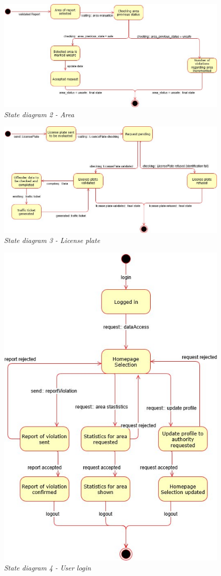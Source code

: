 \begin{figure}[H]
  \centering
  \includegraphics[origin=c,width=\textwidth]{RASD_Images/StateDiagrams/state2.jpg}
  \caption{\textit{State diagram 2 - Area}}
\end{figure}

\begin{figure}[H]
  \centering
  \includegraphics[origin=c,width=\textwidth]{RASD_Images/StateDiagrams/state3.jpg}
  \caption{\textit{State diagram 3 - License plate}}
\end{figure}

\begin{figure}[H]
  \centering
  \includegraphics[origin=c,width=7 cm]{RASD_Images/StateDiagrams/state4.jpg}
  \caption{\textit{State diagram 4 - User login}}
\end{figure}
